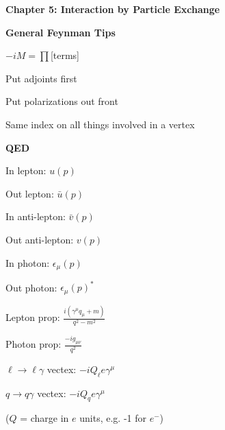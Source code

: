 \textbf{Chapter 5: Interaction by Particle Exchange}

\textbf{General Feynman Tips}

$-iM = \prod$[terms]

Put adjoints first

Put polarizations out front

Same index on all things involved in a vertex

\textbf{QED}

\begin{multicols}{2}
    In lepton: $u(p)$

    Out lepton: $\bar{u}(p)$

    In anti-lepton: $\bar{v}(p)$

    Out anti-lepton: $v(p)$

    In photon: $\epsilon_\mu(p)$ 

    Out photon: $\epsilon_\mu(p)^*$ 

    Lepton prop: $\frac{i(\gamma^\mu q_\mu + m)}{q^2 - m^2}$

    Photon prop: $\frac{-ig_{\mu\nu}}{q^2}$

    $\ell \to \ell\gamma$ vectex: $-iQ_\ell e\gamma^\mu$

    $q \to q\gamma$ vectex: $-iQ_q e\gamma^\mu$

    ($Q$ = charge in $e$ units, e.g. -1 for $e^-$)

\end{multicols}
